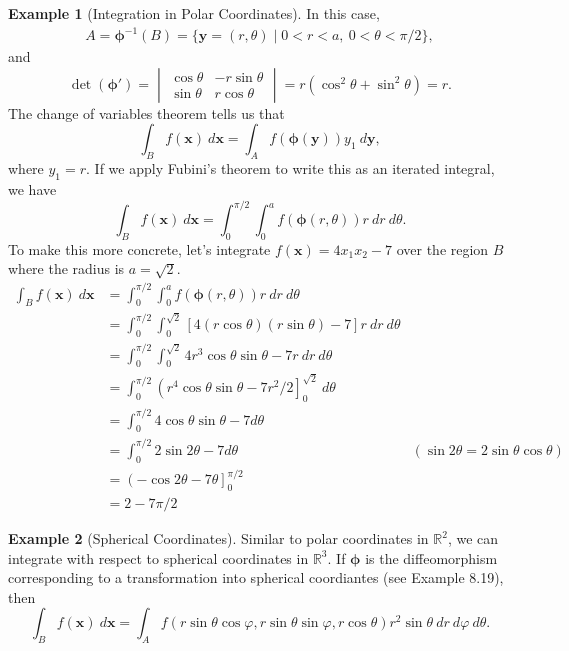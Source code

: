 \documentclass{article}
\newcommand{\R}{\mathbb{R}}
\newcommand{\x}{\mathbf{x}}
\newcommand{\y}{\mathbf{y}}
\theoremstyle{definition}
\newtheorem{example}{Example}[section]
\begin{document}
\begin{example}[Integration in Polar Coordinates]
	In this case,
	\begin{align*}
		A = \boldsymbol{\phi}^{-1}(B)= \{\y = (r,\theta) \mid 0<r<a,\ 0<\theta <\pi/2\},
	\end{align*}
	and 
	$$ \det(\boldsymbol{\phi}') = \begin{vmatrix}
		\cos \theta & -r\sin \theta \\ \sin \theta& r\cos \theta 
	\end{vmatrix} = r(\cos^2\theta + \sin^2\theta) = r.$$
The change of variables theorem tells us that 
$$ \int_B f(\x)\ d\x = \int_A f(\boldsymbol{\phi}(\y))y_1\ d\y,$$ where $y_1 = r$. If we apply Fubini's theorem to write this as an iterated integral, we have
$$  \int_B f(\x)\ d\x = \int_0^{\pi/2}\int_0^a  f(\boldsymbol{\phi}(r,\theta))r\ dr\ d\theta.$$
To make this more concrete, let's integrate $f(\x) = 4x_1x_2-7$ over the region $B$ where the radius is $a = \sqrt 2$. 
\begin{align*}
	\int_B f(\x)\ d\x &  = \int_0^{\pi/2}\int_0^a  f(\boldsymbol{\phi}(r,\theta))r\ dr\ d\theta\\
	& =  \int_0^{\pi/2}\int_0^{\sqrt 2} [4(r\cos\theta)(r\sin\theta) - 7]r\ dr\ d\theta\\
	& = \int_0^{\pi/2}\int_0^{\sqrt 2} 4r^3 \cos \theta\sin \theta - 7r\ dr\ d\theta \\
	& = \int_0^{\pi/2}\left(r^4\cos \theta\sin \theta -7r^2/2\right]_0^{\sqrt 2}\ d\theta\\
	& = \int_0^{\pi/2}4\cos\theta \sin \theta - 7 d \theta \\
	& = \int_0^{\pi/2}2\sin 2\theta - 7 d \theta & (\sin 2\theta = 2 \sin \theta \cos \theta )\\
	& = \left(-\cos 2\theta - 7\theta \right]_0^{\pi/2}\\
	& = 2 - 7\pi/2
\end{align*}
	\end{example}

\begin{example}[Spherical Coordinates]
Similar to polar coordinates in $\R^2$, we can integrate with respect to spherical coordinates in $\R^3$. If $\boldsymbol{\phi}$ is the diffeomorphism corresponding to a transformation into spherical coordiantes (see Example 8.19), then 
$$ \int_B f(\x)\ d\x = \int_A f(r \sin \theta \cos \varphi, r \sin \theta \sin \varphi, r\cos \theta)r^2\sin\theta\ dr\ d\varphi\ d\theta.$$
\end{example}
\end{document}
